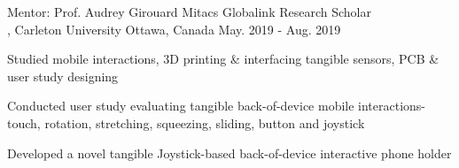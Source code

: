 \begin{cventries}
  \cventry
    {Mentor: Prof. Audrey Girouard} %
    {Mitacs Globalink Research Scholar\\ , Carleton University} %
    {Ottawa, Canada} %
    {May. 2019 - Aug. 2019} %
    {
      \begin{cvitems} %
        \item {Studied mobile interactions, 3D printing \& interfacing tangible sensors, PCB \& user study designing}
        \item {Conducted user study evaluating tangible back-of-device mobile interactions- touch, rotation, stretching, squeezing, sliding, button and joystick}
        \item {Developed a novel tangible Joystick-based back-of-device interactive phone holder}
      \end{cvitems}
    }



\end{cventries}
